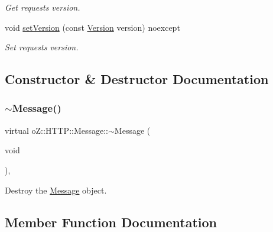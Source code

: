\begin{DoxyCompactItemize}
\begin{DoxyCompactList}\small\item\em Get request\textquotesingle{}s version. \end{DoxyCompactList}\item 
void \mbox{\hyperlink{classo_z_1_1_h_t_t_p_1_1_message_ac3fa35df570a24f54999e1091fac0726}{set\+Version}} (const \mbox{\hyperlink{structo_z_1_1_h_t_t_p_1_1_version}{Version}} version) noexcept
\begin{DoxyCompactList}\small\item\em Set request\textquotesingle{}s version. \end{DoxyCompactList}\end{DoxyCompactItemize}


\subsection{Constructor \& Destructor Documentation}
\mbox{\label{classo_z_1_1_h_t_t_p_1_1_message_a42e40b68d8080d66ca335a2b8fc45c79}} 
\subsubsection{\texorpdfstring{$\sim$Message()}{~Message()}}
{\footnotesize\ttfamily virtual o\+Z\+::\+H\+T\+T\+P\+::\+Message\+::$\sim$\+Message (\begin{DoxyParamCaption}\item[{void}]{ }\end{DoxyParamCaption})\hspace{0.3cm}{\ttfamily [virtual]}, {\ttfamily [default]}}



Destroy the \mbox{\hyperlink{classo_z_1_1_h_t_t_p_1_1_message}{Message}} object. 



\subsection{Member Function Documentation}
\mbox{\label{classo_z_1_1_h_t_t_p_1_1_message_aed4d82d784cf503dbbfa1180f9b3434f}} 
